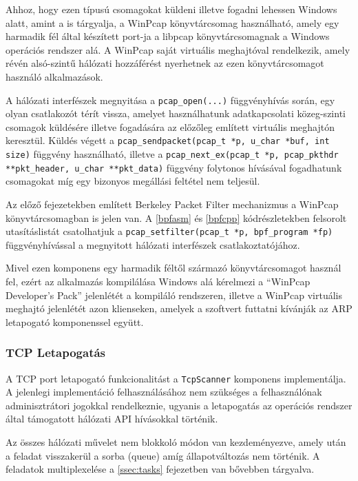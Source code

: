 \documentclass[a4paper,12pt]{article}
\begin{document}
	Ahhoz, hogy ezen típusú csomagokat küldeni illetve fogadni lehessen Windows alatt, amint a \cite{xing10} is tárgyalja, a WinPcap könyvtárcsomag használható, amely egy harmadik fél által készített port-ja a libpcap könyvtárcsomagnak a Windows operációs rendszer alá. A WinPcap saját virtuális meghajtóval rendelkezik, amely révén alsó-szintű hálózati hozzáférést nyerhetnek az ezen könyvtárcsomagot használó alkalmazások.
	
	A hálózati interfészek megnyitása a \texttt{pcap_open(...)} függvényhívás során, egy olyan csatlakozót térít vissza, amelyet használhatunk adatkapcsolati közeg-szinti csomagok küldésére illetve fogadására az előzőleg említett virtuális meghajtón keresztül. Küldés végett a \texttt{pcap_sendpacket(pcap_t *p, u_char *buf, int size)} függvény használható, illetve a \texttt{pcap_next_ex(pcap_t *p, pcap_pkthdr **pkt_header, u_char **pkt_data)} függvény folytonos hívásával fogadhatunk csomagokat míg egy bizonyos megállási feltétel nem teljesül.
	
	Az előző fejezetekben említett Berkeley Packet Filter mechanizmus a WinPcap könyvtárcsomagban is jelen van. A \ref{bpfasm} és \ref{bpfcpp} kódrészletekben felsorolt utasításlistát csatolhatjuk a \texttt{pcap_setfilter(pcap_t *p, bpf_program *fp)} függvényhívással a megnyitott hálózati interfészek csatlakoztatójához.
	
	Mivel ezen komponens egy harmadik féltől származó könyvtárcsomagot használ fel, ezért az alkalmazás kompilálása Windows alá kérelmezi a ``WinPcap Developer's Pack'' jelenlétét a kompiláló rendszeren, illetve a WinPcap virtuális meghajtó jelenlétét azon klienseken, amelyek a szoftvert futtatni kívánják az ARP letapogató komponenssel együtt.

\subsubsection{TCP Letapogatás} \label{ssec:tcpscan}

	A TCP port letapogató funkcionalitást a \texttt{TcpScanner} komponens implementálja. A jelenlegi implementáció felhasználásához nem szükséges a felhasználónak adminisztrátori jogokkal rendelkeznie, ugyanis a letapogatás az operációs rendszer által támogatott hálózati API hívásokkal történik.
	
	Az összes hálózati művelet nem blokkoló módon van kezdeményezve, amely után a feladat visszakerül a sorba (queue) amíg állapotváltozás nem történik. A feladatok multiplexelése a \ref{ssec:tasks} fejezetben van bővebben tárgyalva.
\end{document}
